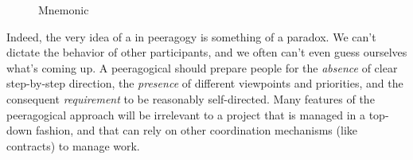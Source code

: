 \begin{wrapfigure}{l}{.52\textwidth}
\vspace{-2.5cm}
\hspace{-.15cm}\resizebox{.55\textwidth}{!}{

}
\hspace{.4cm}
\vspace{-2.75cm}
\caption{Mnemonic \label{mnemonic}}
\vspace{-.5cm}
\end{wrapfigure}

Indeed, the very idea of a  in peeragogy is something
of a paradox.  We can't dictate the behavior of other participants,
and we often can't even guess ourselves what's coming up.  A
peeragogical  should prepare people for the
\emph{absence} of clear step-by-step direction, the \emph{presence} of
different viewpoints and priorities, and the consequent
\emph{requirement} to be reasonably self-directed.  Many features of the
peeragogical approach will be irrelevant to a project that is managed
in a top-down fashion, and that can rely on other coordination
mechanisms (like contracts) to manage work.


